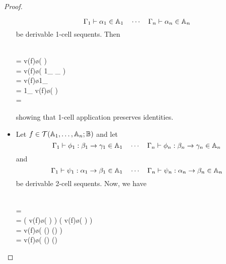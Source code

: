 \documentclass{robinthesisdraft}
\begin{document}
\begin{proof}
\begin{itemize}
\[			\Gamma_{1}\vdash \alpha_{1}\in \mathbb{A}_{1}
			\quad\cdots\quad
			\Gamma_{n}\vdash \alpha_{n}\in \mathbb{A}_{n}
		\]
		be derivable 1-cell sequents. Then
		\begin{mmulti}[.5em]
			\\= v(f)\o\Bigl(
				\tn\cdots\tn
			\Bigr)
			\\= v(f)\o\Bigl(
				1_{}
				\tn\cdots{}_{}
			\Bigr)
			\\= v(f)\o1_{
				\tn\cdots\tn
			}
			\\= 1_{
				v(f)\o(
					\tn\cdots\tn
				)
			}
			\\= 
		\end{mmulti}
		showing that 1-cell application preserves identities.
	\item Let $f\in{\mathcal{T}}(\mathbb{A}_{1},\dots,\mathbb{A}_{n};\mathbb{B})$ and let
		\[
			\Gamma_{1}\vdash\phi_{1}: \beta_{1}\to\gamma_{1}\in\mathbb{A}_{1}
			\quad\cdots\quad
			\Gamma_{n}\vdash\phi_{n}: \beta_{n}\to\gamma_{n}\in\mathbb{A}_{n}
		\]
		and
		\[
			\Gamma_{1}\vdash\psi_{1}: \alpha_{1}\to\beta_{1}\in\mathbb{A}_{1}
			\quad\cdots\quad
			\Gamma_{n}\vdash\psi_{n}: \alpha_{n}\to\beta_{n}\in\mathbb{A}_{n}
		\]
		be derivable 2-cell sequents. Now, we have
		\begin{mmulti}[1em]
			\\=
			\cdot
			\\=
			\bigl( v(f)\o (
				\tn\cdots{}
			) \bigr)
			\cdot
			\bigl( v(f)\o (
				\tn\cdots{}
			) \bigr)
			\\=
			v(f)\o\bigl(
				(\tn\cdots{})
				\cdot (\tn\cdots{})
			\bigr)
			\\=
			v(f)\o\bigl(
				(\cdot{})
				\tn\cdots\tn
				(\cdot{})

\end{mmulti}
\end{itemize}
\end{proof}
\end{document}
